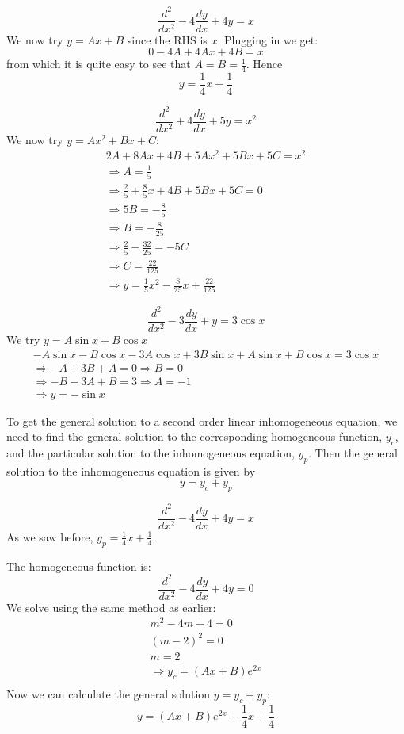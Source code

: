 \documentclass[a4paper,10pt]{article}
\begin{document}
\begin{ex}
	\[
		\frac{d^2}{dx^2} - 4\frac{dy}{dx} + 4y = x
	\]
	We now try $y = Ax+B$ since the RHS is $x$. Plugging in we get:
	\[
		0 - 4A + 4Ax + 4B = x
	\]
	from which it is quite easy to see that $A = B = \frac{1}{4}$. Hence
	\[
		y = \frac{1}{4}x + \frac{1}{4}
	\]
\end{ex}

\begin{ex}
	\[
		\frac{d^2}{dx^2} + 4\frac{dy}{dx} + 5y = x^2
	\]
	We now try $y = Ax^2 + Bx + C$:
	\begin{gather*}
		2A + 8Ax + 4B + 5Ax^2 + 5Bx + 5C = x^2 \\
		\Rightarrow A = \frac{1}{5} \\
		\Rightarrow \frac{2}{5} + \frac{8}{5}x + 4B + 5Bx + 5C = 0 \\
		\Rightarrow 5B = -\frac{8}{5} \\
		\Rightarrow B = -\frac{8}{25} \\
		\Rightarrow \frac{2}{5} - \frac{32}{25} = -5C \\
		\Rightarrow C = \frac{22}{125} \\
		\Rightarrow y = \frac{1}{5}x^2 - \frac{8}{25} x + \frac{22}{125}
	\end{gather*}
\end{ex}

\begin{ex}
	\[
		\frac{d^2}{dx^2} - 3\frac{dy}{dx} + y = 3\cos x
	\]
	We try $y = A\sin x + B \cos x$
	\begin{gather*}
		-A\sin x - B\cos x - 3A\cos x + 3B\sin x + A\sin x + B\cos x
		= 3\cos x \\
		\Rightarrow -A + 3B + A = 0 \Rightarrow B = 0 \\
		\Rightarrow -B - 3A + B = 3 \Rightarrow A = -1 \\
		\Rightarrow y = -\sin x
	\end{gather*}
\end{ex}

To get the general solution to a second order linear inhomogeneous
equation, we need to find the general solution to the corresponding
homogeneous function, $y_c$, and the particular solution to the
inhomogeneous equation, $y_p$. Then the general solution to the
inhomogeneous equation is given by
\[
	y = y_c + y_p
\]

\begin{ex}
	\[
		\frac{d^2}{dx^2} - 4\frac{dy}{dx} + 4y = x
	\]
	As we saw before, $y_p = \frac{1}{4}x + \frac{1}{4}$.

	The homogeneous function is:
	\[
		\frac{d^2}{dx^2} - 4\frac{dy}{dx} + 4y = 0
	\]
	We solve using the same method as earlier:
	\begin{gather*}
		m^2 - 4m + 4 = 0 \\
		(m - 2)^2 = 0 \\
		m = 2 \\
		\Rightarrow y_c = (Ax+B)e^{2x} \\
	\end{gather*}
	Now we can calculate the general solution $y = y_c + y_p$:
	\[
		y = (Ax+B)e^{2x} + \frac{1}{4}x + \frac{1}{4}
	\]
\end{ex}
\end{document}
